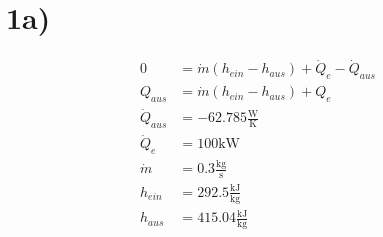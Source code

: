 

\section*{1a)}
\begin{align*}
0 &= \dot{m}(h_{ein} - h_{aus}) + \dot{Q}_e - \dot{Q}_{aus} \\
Q_{aus} &= \dot{m}(h_{ein} - h_{aus}) + Q_e \\
\dot{Q}_{aus} &= -62.785 \frac{\text{W}}{\text{K}} \\
\dot{Q}_e &= 100 \text{kW} \\
\dot{m} &= 0.3 \frac{\text{kg}}{\text{s}} \\
h_{ein} &= 292.5 \frac{\text{kJ}}{\text{kg}} \\
h_{aus} &= 415.04 \frac{\text{kJ}}{\text{kg}}
\end{align*}